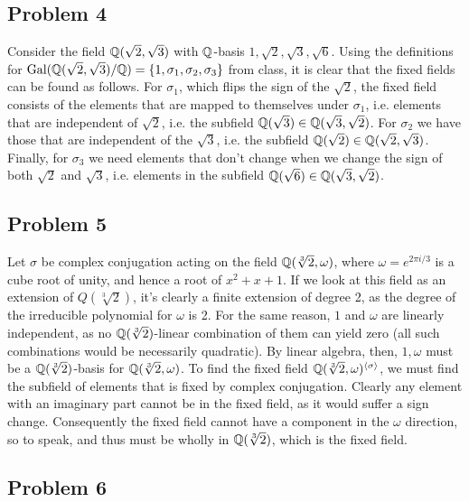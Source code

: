 \documentclass{../../mathnotes}
\begin{document}
\subsection*{Problem 4}

Consider the field $\mathbb{Q}(\sqrt{2},\sqrt{3})$ with $\mathbb{Q}$-basis $1,\sqrt{2},\sqrt{3},\sqrt{6}$. Using the definitions
for $\operatorname{Gal}(\mathbb{Q}(\sqrt{2},\sqrt{3})/\mathbb{Q})=\left\{ 1,\sigma_1,\sigma_2,\sigma_3 \right\}$ from class, it is clear that the fixed
fields can be found as follows. For $\sigma_1$, which flips the sign of the $\sqrt{2}$, the fixed field consists of the
elements that are mapped to themselves under $\sigma_1$, i.e. elements that are independent of $\sqrt{2}$, i.e.
the subfield $\mathbb{Q}(\sqrt{3})\in\mathbb{Q}(\sqrt{3},\sqrt{2})$. For $\sigma_2$ we have those that are independent of the $\sqrt{3}$,
i.e. the subfield $\mathbb{Q}(\sqrt{2})\in\mathbb{Q}(\sqrt{2},\sqrt{3})$. Finally, for $\sigma_3$ we need elements that don't change
when we change the sign of both $\sqrt{2}$ and $\sqrt{3}$, i.e. elements in the subfield $\mathbb{Q}(\sqrt{6})\in\mathbb{Q}(\sqrt{3},\sqrt{2})$.

\subsection*{Problem 5}

Let $\sigma$ be complex conjugation acting on the field $\mathbb{Q}(\sqrt[3]{2},\omega)$, where $\omega=e^{2\pi i/3}$
is a cube root of unity, and hence a root of $x^2+x+1$. If we look at this field as an extension of $Q(\sqrt[3]{2})$,
it's clearly a finite extension of degree 2, as the degree of the irreducible polynomial for $\omega$ is 2. For
the same reason, $1$ and $\omega$ are linearly independent, as no $\mathbb{Q}(\sqrt[3]{2})$-linear combination of them
can yield zero (all such combinations would be necessarily quadratic). By linear algebra, then, $1,\omega$ must be
a $\mathbb{Q}(\sqrt[3]{2})$-basis for $\mathbb{Q}(\sqrt[3]{2},\omega)$. To find the fixed field $\mathbb{Q}(\sqrt[3]{2},\omega)^{\langle\sigma\rangle}$,
we must find the subfield of elements that is fixed by complex conjugation. Clearly any element with an imaginary part cannot
be in the fixed field, as it would suffer a sign change. Consequently the fixed field cannot have a component in the $\omega$ direction,
so to speak, and thus must be wholly in $\mathbb{Q}(\sqrt[3]{2})$, which is the fixed field.

\subsection*{Problem 6}
\end{document}
